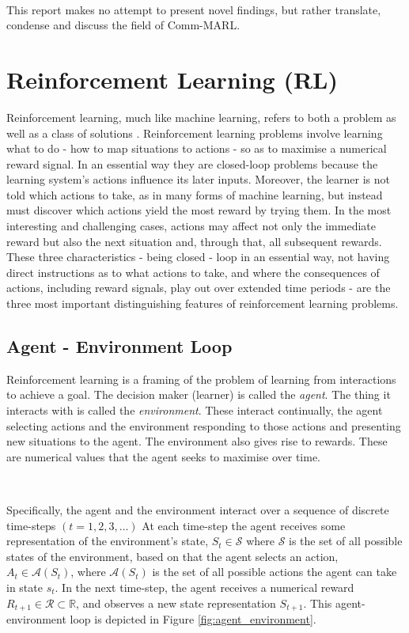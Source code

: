 \documentclass{article}
\begin{document}
\

This report makes no attempt to present novel findings, but rather translate, condense and discuss the field of Comm-MARL. 

\newpage

\section{Reinforcement Learning (RL)} \label{sec:rl}

Reinforcement learning, much like machine learning, refers to both a problem as well as a class of solutions \citep{sutton2018reinforcement}. Reinforcement learning problems involve learning what to do - how to map situations to actions - so as to maximise a numerical reward signal. In an essential way they are closed-loop problems because the learning system’s actions influence its later inputs. Moreover, the learner is not told which actions to take, as in many forms of machine learning, but instead must discover which actions yield the most reward by trying them. In the most interesting and challenging cases, actions may affect not only the immediate reward but also the next situation and, through that, all subsequent rewards. These three characteristics - being closed - loop in an essential way, not having direct instructions as to what actions to take, and where the consequences of actions, including reward signals, play out over extended time periods - are the three most important distinguishing features of reinforcement learning problems.


\subsection{Agent - Environment Loop}

Reinforcement learning is a framing of the problem of learning from interactions to achieve a goal. The decision maker (learner) is called the \textit{agent}. The thing it interacts with is called the \textit{environment}. These interact continually, the agent selecting actions and the environment responding to those actions and presenting new situations to the agent. The environment also gives rise to rewards. These are numerical values that the agent seeks to maximise over time.

\

Specifically, the agent and the environment interact over a sequence of discrete time-steps $(t = 1, 2, 3, \hdots)$ At each time-step the agent receives some representation of the environment's state, $S_t \in \mathcal{S}$ where $\mathcal{S}$ is the set of all possible states of the environment, based on that the agent selects an action, $A_t \in \mathcal{A}(S_t)$, where $\mathcal{A}(S_t)$ is the set of all possible actions the agent can take in state $s_t$. In the next time-step, the agent receives a numerical reward $R_{t+1} \in \mathcal{R} \subset \mathbb{R}$, and observes a new state representation $S_{t+1}$. This agent-environment loop is depicted in Figure \ref{fig:agent_environment}. 
\end{document}

